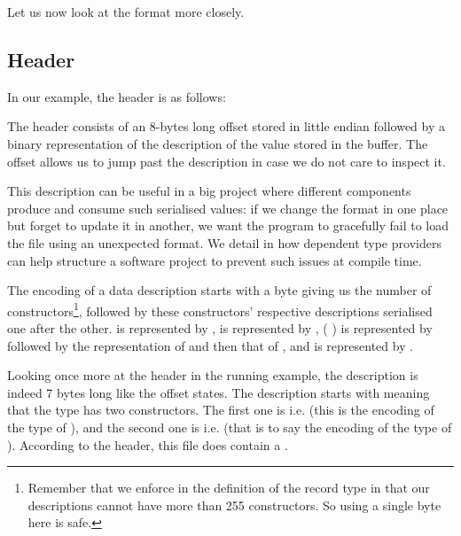Let us now look at the format more closely.

\subsection{Header}

In our example, the header is as follows:
\begin{hexdump}
 
\end{hexdump}

The header consists of an 8-bytes long offset stored in little endian
followed by a binary representation of the
 description of the value stored in the buffer.
The offset allows us to jump past the description in case we do
not care to inspect it.

This description can be useful in a big project where different
components produce and consume such serialised values:
if we change the format in one place but forget to update
it in another, we want the program to gracefully
fail to load the file using an unexpected format.
%
We detail in  how dependent
type providers~\citep{DBLP:conf/icfp/Christiansen13}
can help structure a software project
to prevent such issues at compile time.

The encoding of a data description starts with a byte giving us the number
of constructors\footnote{
Remember that we enforce in the definition of the  record
type in 
that our descriptions cannot have more than 255 constructors. So using
a single byte here is safe.},
followed by these constructors' respective descriptions
serialised one after the other.
%
 is represented by ,
 is represented by ,
(  ) is represented by
 followed by the representation of  and then that of ,
and  is represented by .


Looking once more at the header in the running example,
the  description is indeed 7 bytes long like the offset states.
The  description starts with 
meaning that the type has two constructors.
The first one is  i.e. 
(this is the encoding of the type of ),
and the second one is  i.e.
\IdrisKeyword{(} 
\IdrisKeyword{(}  \IdrisKeyword{))}
(that is to say the encoding of the type of ).
%
According to the header, this file does contain a .

